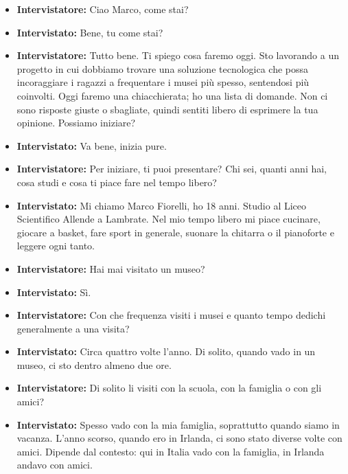 \documentclass{article}
\begin{document}
\begin{itemize}
    \item \textbf{Intervistatore:} Ciao Marco, come stai?

    \item \textbf{Intervistato:} Bene, tu come stai?

    \item \textbf{Intervistatore:} Tutto bene. Ti spiego cosa faremo oggi. Sto lavorando a un progetto in cui dobbiamo trovare una soluzione tecnologica che possa incoraggiare i ragazzi a frequentare i musei più spesso, sentendosi più coinvolti. Oggi faremo una chiacchierata; ho una lista di domande. Non ci sono risposte giuste o sbagliate, quindi sentiti libero di esprimere la tua opinione. Possiamo iniziare?

    \item \textbf{Intervistato:} Va bene, inizia pure.

    \item \textbf{Intervistatore:} Per iniziare, ti puoi presentare? Chi sei, quanti anni hai, cosa studi e cosa ti piace fare nel tempo libero?

    \item \textbf{Intervistato:} Mi chiamo Marco Fiorelli, ho 18 anni. Studio al Liceo Scientifico Allende a Lambrate. Nel mio tempo libero mi piace cucinare, giocare a basket, fare sport in generale, suonare la chitarra o il pianoforte e leggere ogni tanto.

    \item \textbf{Intervistatore:} Hai mai visitato un museo?

    \item \textbf{Intervistato:} Sì.

    \item \textbf{Intervistatore:} Con che frequenza visiti i musei e quanto tempo dedichi generalmente a una visita?

    \item \textbf{Intervistato:} Circa quattro volte l’anno. Di solito, quando vado in un museo, ci sto dentro almeno due ore.

    \item \textbf{Intervistatore:} Di solito li visiti con la scuola, con la famiglia o con gli amici?

    \item \textbf{Intervistato:} Spesso vado con la mia famiglia, soprattutto quando siamo in vacanza. L’anno scorso, quando ero in Irlanda, ci sono stato diverse volte con amici. Dipende dal contesto: qui in Italia vado con la famiglia, in Irlanda andavo con amici.


\end{itemize}
\end{document}
